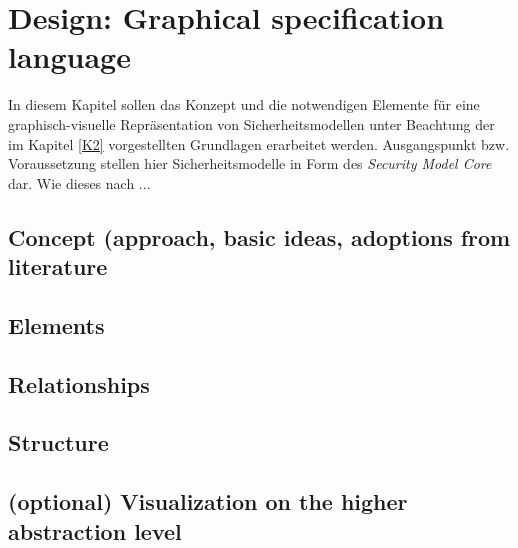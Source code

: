 \chapter{Design: Graphical specification language}
\label{graphical_specification_language}
In diesem Kapitel sollen das Konzept und die notwendigen Elemente für eine graphisch-visuelle Repräsentation von Sicherheitsmodellen unter Beachtung der im Kapitel \ref{K2} vorgestellten Grundlagen erarbeitet werden. Ausgangspunkt bzw. Voraussetzung stellen hier Sicherheitsmodelle in Form des \textit{Security Model Core} dar. Wie dieses nach \cite{Poelck14} ...

\section{Concept (approach, basic ideas, adoptions from literature}

\section{Elements}

\section{Relationships}

\section{Structure}

\section{(optional) Visualization on the higher abstraction level}